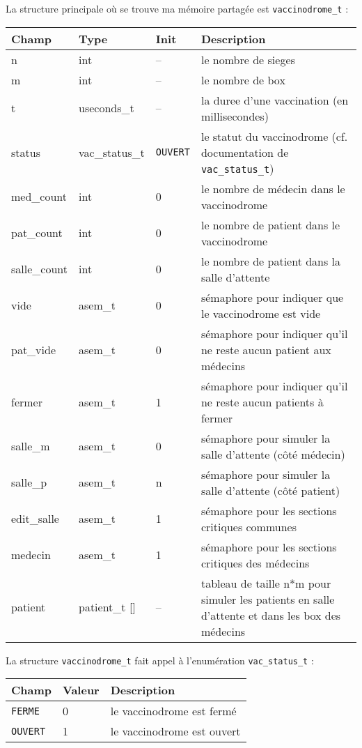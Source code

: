 \documentclass[a4paper]{article}
\begin{document}
\bigskip La structure principale où se trouve ma mémoire partagée est \texttt{vaccinodrome\_t} :
\bigskip \newline
  \begin{tabularx}{\linewidth}{|l|l|l|X|}
    \hline
    Champ & Type & Init & Description \\ \hline%
    n & int & -- & le nombre de sieges \\ \hline%
    m & int & -- & le nombre de box \\ \hline%
    t & useconds\_t & -- & la duree d'une vaccination (en millisecondes) \\ \hline%
    status & vac\_status\_t & \texttt{OUVERT} & le statut du vaccinodrome (cf. documentation de
    \texttt{vac\_status\_t})\\ \hline%
    med\_count & int & 0 & le nombre de médecin dans le vaccinodrome \\ \hline%
    pat\_count & int & 0 & le nombre de patient dans le vaccinodrome \\ \hline%
    salle\_count & int & 0 & le nombre de patient dans la salle d'attente \\ \hline%
    vide & asem\_t & 0 & sémaphore pour indiquer que le vaccinodrome est vide \\ \hline%
    pat\_vide & asem\_t & 0 & sémaphore pour indiquer qu'il ne reste aucun patient aux médecins\\ \hline%
    fermer & asem\_t & 1 & sémaphore pour indiquer qu'il ne reste aucun patients à fermer \\ \hline%
    salle\_m & asem\_t & 0 & sémaphore pour simuler la salle d'attente (côté médecin)\\ \hline%
    salle\_p & asem\_t & n & sémaphore pour simuler la salle d'attente (côté patient)\\ \hline%
    edit\_salle & asem\_t & 1 & sémaphore pour les sections critiques communes \\ \hline%
    medecin & asem\_t & 1 & sémaphore pour les sections critiques des médecins \\ \hline%
    patient & patient\_t [] & -- & tableau de taille n*m pour simuler les patients en salle d'attente et dans les box des médecins\\ \hline%
  \end{tabularx}
  
\bigskip La structure \texttt{vaccinodrome\_t} fait appel à l'enumération \texttt{vac\_status\_t} :
\bigskip \newline
  \begin{tabularx}{\linewidth}{|l|l|X|}
    \hline
    Champ & Valeur & Description \\ \hline%
    \texttt{FERME} & 0 & le vaccinodrome est fermé \\ \hline%
    \texttt{OUVERT} & 1 & le vaccinodrome est ouvert \\ \hline%
  \end{tabularx}
\end{document}
